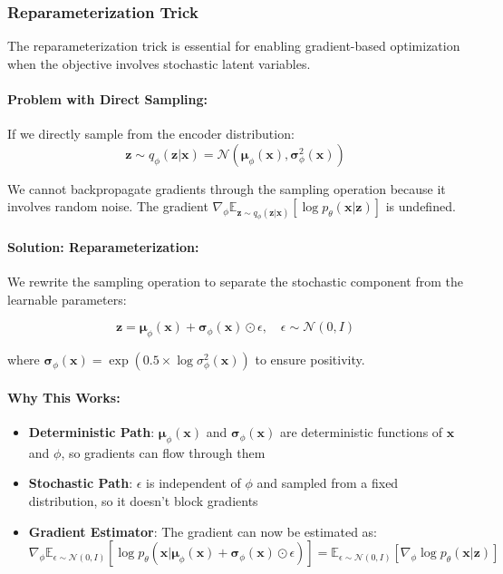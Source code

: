\documentclass[conference]{IEEEtran}
\newcommand{\logvar}{\log \sigma^2}
\begin{document}
\subsubsection{Reparameterization Trick}

The reparameterization trick is essential for enabling gradient-based optimization when the objective involves stochastic latent variables.

\paragraph{Problem with Direct Sampling:}
If we directly sample from the encoder distribution:
\begin{equation}
\mathbf{z} \sim q_\phi(\mathbf{z}|\mathbf{x}) = \mathcal{N}(\boldsymbol{\mu}_\phi(\mathbf{x}), \boldsymbol{\sigma}_\phi^2(\mathbf{x}))
\end{equation}

We cannot backpropagate gradients through the sampling operation because it involves random noise. The gradient $\nabla_\phi \mathbb{E}_{\mathbf{z} \sim q_\phi(\mathbf{z}|\mathbf{x})}[\log p_\theta(\mathbf{x}|\mathbf{z})]$ is undefined.

\paragraph{Solution: Reparameterization:}
We rewrite the sampling operation to separate the stochastic component from the learnable parameters:

\begin{equation}
\mathbf{z} = \boldsymbol{\mu}_\phi(\mathbf{x}) + \boldsymbol{\sigma}_\phi(\mathbf{x}) \odot \epsilon, \quad \epsilon \sim \mathcal{N}(0, I)
\end{equation}

where $\boldsymbol{\sigma}_\phi(\mathbf{x}) = \exp(0.5 \times \logvar_\phi(\mathbf{x}))$ to ensure positivity.

\paragraph{Why This Works:}
\begin{itemize}
    \item \textbf{Deterministic Path}: $\boldsymbol{\mu}_\phi(\mathbf{x})$ and $\boldsymbol{\sigma}_\phi(\mathbf{x})$ are deterministic functions of $\mathbf{x}$ and $\phi$, so gradients can flow through them
    \item \textbf{Stochastic Path}: $\epsilon$ is independent of $\phi$ and sampled from a fixed distribution, so it doesn't block gradients
    \item \textbf{Gradient Estimator}: The gradient can now be estimated as:
    \begin{equation}
    \nabla_\phi \mathbb{E}_{\epsilon \sim \mathcal{N}(0,I)}[\log p_\theta(\mathbf{x}|\boldsymbol{\mu}_\phi(\mathbf{x}) + \boldsymbol{\sigma}_\phi(\mathbf{x}) \odot \epsilon)] = \mathbb{E}_{\epsilon \sim \mathcal{N}(0,I)}[\nabla_\phi \log p_\theta(\mathbf{x}|\mathbf{z})]
    \end{equation}
\end{itemize}
\end{document}
